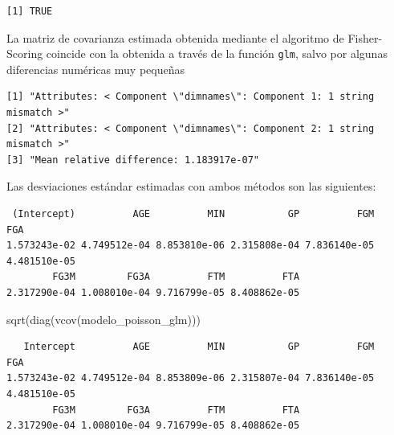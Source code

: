 \documentclass[
  letterpaper,
  DIV=11,
  numbers=noendperiod]{scrartcl}
\newenvironment{Shaded}{\begin{snugshade}}{\end{snugshade}}
\newcommand{\FunctionTok}[1]{\textcolor[rgb]{0.28,0.35,0.67}{#1}}
\newcommand{\NormalTok}[1]{\textcolor[rgb]{0.00,0.23,0.31}{#1}}
\newcommand{\SpecialCharTok}[1]{\textcolor[rgb]{0.37,0.37,0.37}{#1}}
\begin{document}
\begin{verbatim}
[1] TRUE
\end{verbatim}

La matriz de covarianza estimada obtenida mediante el algoritmo de
Fisher-Scoring coincide con la obtenida a través de la función
\texttt{glm}, salvo por algunas diferencias numéricas muy pequeñas

\begin{Shaded}
\end{Shaded}

\begin{verbatim}
[1] "Attributes: < Component \"dimnames\": Component 1: 1 string mismatch >"
[2] "Attributes: < Component \"dimnames\": Component 2: 1 string mismatch >"
[3] "Mean relative difference: 1.183917e-07"                                
\end{verbatim}

Las desviaciones estándar estimadas con ambos métodos son las
siguientes:

\begin{Shaded}
\end{Shaded}

\begin{verbatim}
 (Intercept)          AGE          MIN           GP          FGM          FGA 
1.573243e-02 4.749512e-04 8.853810e-06 2.315808e-04 7.836140e-05 4.481510e-05 
        FG3M         FG3A          FTM          FTA 
2.317290e-04 1.008010e-04 9.716799e-05 8.408862e-05 
\end{verbatim}

\begin{Shaded}
\begin{Highlighting}[]
\FunctionTok{sqrt}\NormalTok{(}\FunctionTok{diag}\NormalTok{(}\FunctionTok{vcov}\NormalTok{(modelo\_poisson\_glm)))}
\end{Highlighting}
\end{Shaded}

\begin{verbatim}
   Intercept          AGE          MIN           GP          FGM          FGA 
1.573243e-02 4.749512e-04 8.853809e-06 2.315807e-04 7.836140e-05 4.481510e-05 
        FG3M         FG3A          FTM          FTA 
2.317290e-04 1.008010e-04 9.716799e-05 8.408862e-05 
\end{verbatim}
\end{document}
